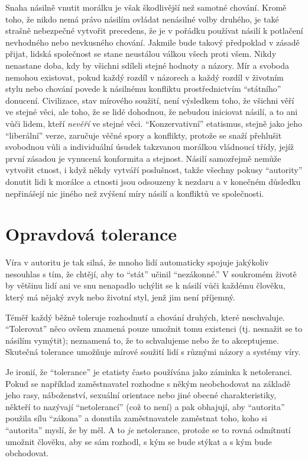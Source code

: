 \documentclass{book}
\begin{document}
Snaha násilně vnutit morálku je však škodlivější než samotné chování. Kromě toho, že nikdo nemá právo násilím ovládat nenásilné volby druhého, je také strašně nebezpečné vytvořit precedens, že je v pořádku používat násilí k potlačení nevhodného nebo nevkusného chování. Jakmile bude takový předpoklad v zásadě přijat, lidská společnost se stane neustálou válkou všech proti všem. Nikdy nenastane doba, kdy by všichni sdíleli stejné hodnoty a názory. Mír a svoboda nemohou existovat, pokud každý rozdíl v názorech a každý rozdíl v životním stylu nebo chování povede k násilnému konfliktu prostřednictvím \enquote{státního} donucení. Civilizace, stav mírového soužití, není výsledkem toho, že všichni věří ve stejné věci, ale toho, že se lidé dohodnou, že nebudou iniciovat násilí, a to ani vůči lidem, kteří \emph{nevěří} ve stejné věci. \enquote{Konzervativní} etatismus, stejně jako jeho \enquote{liberální} verze, zaručuje věčné spory a konflikty, protože se snaží přehlušit svobodnou vůli a individuální úsudek takzvanou morálkou vládnoucí třídy, jejíž první zásadou je vynucená konformita a stejnost. Násilí samozřejmě nemůže vytvořit ctnost, i když někdy vytváří poslušnost, takže všechny pokusy \enquote{autority} donutit lidi k morálce a ctnosti jsou odsouzeny k nezdaru a v konečném důsledku nepřinášejí nic jiného než zvýšení míry násilí a konfliktů ve společnosti.

\section{Opravdová tolerance}

Víra v autoritu je tak silná, že mnoho lidí automaticky spojuje jakýkoliv nesouhlas s tím, že chtějí, aby to \enquote{stát} učinil \enquote{nezákonné.} V soukromém životě by většinu lidí ani ve snu nenapadlo uchýlit se k násilí vůči každému člověku, který má nějaký zvyk nebo životní styl, jenž jim není příjemný.

Téměř každý běžně toleruje rozhodnutí a chování druhých, které neschvaluje. \enquote{Tolerovat} něco ovšem znamená pouze umožnit tomu existenci (tj. nesnažit se to násilím vymýtit); neznamená to, že to schvalujeme nebo že to akceptujeme. Skutečná tolerance umožňuje mírové soužití lidí s různými názory a systémy víry.

Je ironií, že \enquote{tolerance} je etatisty často používána jako záminka k netoleranci. Pokud se například zaměstnavatel rozhodne s někým neobchodovat na základě jeho rasy, náboženství, sexuální orientace nebo jiné obecné charakteristiky, někteří to nazývají \enquote{netolerancí} (což to není) a pak obhajují, aby \enquote{autorita} použila sílu \enquote{zákona} a donutila zaměstnavatele zaměstnat toho, koho si \enquote{autorita} myslí, že by měl. A to \emph{je} netolerance, protože se to rovná odmítnutí umožnit člověku, aby se sám rozhodl, s kým se bude stýkat a s kým bude obchodovat.
\end{document}
